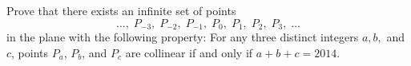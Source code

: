 Prove that there exists an infinite set of points \[ \dots, \; P_{-3}, \; P_{-2},\; P_{-1},\; P_0,\; P_1,\; P_2,\; P_3,\; \dots \] in the plane with the following property: For any three distinct integers $a,b,$ and $c$,  points $P_a$,  $P_b$,  and $P_c$ are collinear if and only if $a+b+c=2014$.